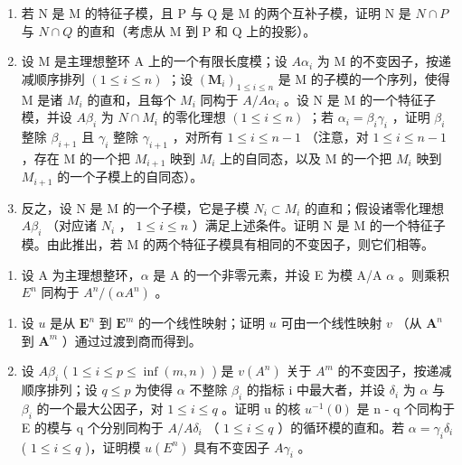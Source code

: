 \begin{enumerate}
\def\labelenumi{\alph{enumi})}
\item
  若 N 是 M 的特征子模，且 P 与 Q 是 M 的两个互补子模，证明 N 是 \(N \cap P\) 与 \(N \cap Q\) 的直和（考虑从 M 到 P 和 Q 上的投影）。
\item
  设 M 是主理想整环 A 上的一个有限长度模；设 \(A\alpha_{i}\) 为 M 的不变因子，按递减顺序排列 \((1 \leqslant i \leqslant n)\) ；设 \((\mathbf{M}_{i})_{1 \leqslant i \leqslant n}\) 是 M 的子模的一个序列，使得 M 是诸 \(M_{i}\) 的直和，且每个 \(M_{i}\) 同构于 \(A/A\alpha_{i}\) 。设 N 是 M 的一个特征子模，并设 \(A\beta_{i}\) 为 \(N \cap M_{i}\) 的零化理想 \((1 \leqslant i \leqslant n)\) ；若 \(\alpha_{i} = \beta_{i}\gamma_{i}\) ，证明 \(\beta_{i}\) 整除 \(\beta_{i+1}\) 且 \(\gamma_{i}\) 整除 \(\gamma_{i+1}\) ，对所有 \(1 \leqslant i \leqslant n-1\) （注意，对 \(1 \leqslant i \leqslant n-1\) ，存在 M 的一个把 \(M_{i+1}\) 映到 \(M_{i}\) 上的自同态，以及 M 的一个把 \(M_{i}\) 映到 \(M_{i+1}\) 的一个子模上的自同态）。
\item
  反之，设 N 是 M 的一个子模，它是子模 \(N_{i} \subset M_{i}\) 的直和；假设诸零化理想 \(A\beta_{i}\) （对应诸 \(N_{i}\) ， \(1 \leqslant i \leqslant n\) ）满足上述条件。证明 N 是 M 的一个特征子模。由此推出，若 M 的两个特征子模具有相同的不变因子，则它们相等。
\end{enumerate}

\begin{enumerate}
\def\labelenumi{\arabic{enumi})}
\setcounter{enumi}{16}
\tightlist
\item
  设 A 为主理想整环，\(\alpha\) 是 A 的一个非零元素，并设 E 为模 A/A \(\alpha\) 。则乘积 \(E^{n}\) 同构于 \(A^{n}/(\alpha A^{n})\) 。
\end{enumerate}

\begin{enumerate}
\def\labelenumi{\alph{enumi})}
\item
  设 \(u\) 是从 \(\mathbf{E}^n\) 到 \(\mathbf{E}^m\) 的一个线性映射；证明 \(u\) 可由一个线性映射 \(v\) （从 \(\mathbf{A}^n\) 到 \(\mathbf{A}^m\) ）通过过渡到商而得到。
\item
  设 \(A\beta_{i}\) ( \(1 \leqslant i \leqslant p \leqslant \inf(m, n)\) ) 是 \(v(A^{n})\) 关于 \(A^{m}\) 的不变因子，按递减顺序排列；设 \(q \leqslant p\) 为使得 \(\alpha\) 不整除 \(\beta_{i}\) 的指标 i 中最大者，并设 \(\delta_{i}\) 为 \(\alpha\) 与 \(\beta_{i}\) 的一个最大公因子，对 \(1 \leqslant i \leqslant q\) 。证明 u 的核 \(u^{-1}(0)\) 是 n - q 个同构于 E 的模与 q 个分别同构于 \(A/A\delta_{i}\) （ \(1 \leqslant i \leqslant q\) ）的循环模的直和。若 \(\alpha = \gamma_{i}\delta_{i}\) ( \(1 \leqslant i \leqslant q\) )，证明模 \(u(E^{n})\) 具有不变因子 \(A\gamma_{i}\) 。
\end{enumerate}

